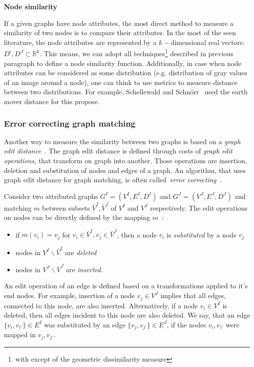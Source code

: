 \textbf{Node similarity}

If a given graphs have node attributes, the most direct method to measure a similarity of two nodes is to compare their attributes. In the most of the seen literature, the node attributes are represented by a $k-$dimensional real vectors: $D^i,D^J\subset\mathbb{R}^k$. This means, we can adopt all techniques\footnote{with except of the geometric dissimilarity measure} described in previous paragraph to define a node similarity function. Additionally, in case when node attributes can be considered as some distribution (e.g. distribution of gray values of an image around a node), one can think to use metrics to measure distance between two distributions. For example, Schellewald and Schn\"orr~\cite{Schellewald2005} used the earth mover distance for this propose.
\subsubsection{Error correcting graph matching}
Another way to measure the similarity between two graphs is based on a \emph{graph edit distance}~\cite{Bunke1983_inexactGM}. The graph edit distance is defined through costs of \emph{graph edit operations}, that transform on graph into another. Those operations are insertion, deletion and substitution of nodes and edges of a graph. An algorithm, that uses graph edit distance for graph matching, is often called~\emph{error correcting}~\cite{Conte2004}.

Consider two attributed graphs $G^I = (V^I, E^I,D^I)$ and $G^J = (V^J, E^J,D^J)$ and matching $m$ between subsets $\bar{V}^I,\bar{V}^J$ of $V^I$ and $V^J$ respectively. The edit operations on nodes can be directly defined by the mapping $m$~\cite{Bunke1998_ErrTolerantGM}:
\begin{itemize}
	\item if $m(v_i)=v_j$ for $v_i\in\bar{V}^I,v_j\in\bar{V}^J$, then a node $v_i$ is \emph{substituted} by a node $v_j$
	\item nodes in $V^I\backslash\bar{V}^I$ are \emph{deleted}
	\item nodes in $V^J\backslash\bar{V}^J$ are \emph{inserted}.
\end{itemize}
An edit operation of an edge is defined based on a transformations applied to it's end nodes. For example, insertion of a node $v_j\in V^J$ implies that all edges, connected to this node, are also inserted. Alternatively, if a node $v_i\in V^I$ is deleted, then all edges incident to this node are also deleted. We say, that an edge $\{v_i,v_{i'}\}\in E^I$ was substituted by an edge $\{v_j,v_{j'}\}\in E^J$, if the nodes $v_i,v_{i'}$ were mapped in $v_j,v_{j'}$.

